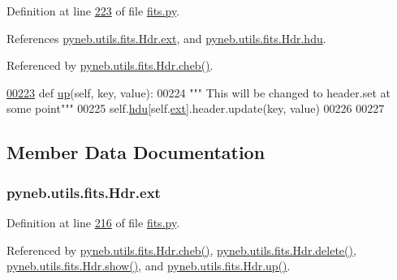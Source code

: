 Definition at line \hyperlink{fits_8py_source_l00223}{223} of file \hyperlink{fits_8py_source}{fits.\+py}.



References \hyperlink{fits_8py_source_l00216}{pyneb.\+utils.\+fits.\+Hdr.\+ext}, and \hyperlink{fits_8py_source_l00215}{pyneb.\+utils.\+fits.\+Hdr.\+hdu}.



Referenced by \hyperlink{fits_8py_source_l00232}{pyneb.\+utils.\+fits.\+Hdr.\+cheb()}.


\begin{DoxyCode}
\hypertarget{classpyneb_1_1utils_1_1fits_1_1_hdr_l00223}{}\hyperlink{classpyneb_1_1utils_1_1fits_1_1_hdr_aae5b01b9bc70e2787f31825ff63152a6}{00223}     \textcolor{keyword}{def }\hyperlink{classpyneb_1_1utils_1_1fits_1_1_hdr_aae5b01b9bc70e2787f31825ff63152a6}{up}(self, key, value):
00224         \textcolor{stringliteral}{""" This will be changed to header.set at some point"""}
00225         self.\hyperlink{classpyneb_1_1utils_1_1fits_1_1_hdr_a23de98701ac30e7c56654f92d9956fca}{hdu}[self.\hyperlink{classpyneb_1_1utils_1_1fits_1_1_hdr_a1c2f102effab05a497e3a21ed3291359}{ext}].header.update(key, value)
00226         
00227 
\end{DoxyCode}


\subsection{Member Data Documentation}
\hypertarget{classpyneb_1_1utils_1_1fits_1_1_hdr_a1c2f102effab05a497e3a21ed3291359}{}
\subsubsection[{ext}]{\setlength{\rightskip}{0pt plus 5cm}pyneb.\+utils.\+fits.\+Hdr.\+ext}\label{classpyneb_1_1utils_1_1fits_1_1_hdr_a1c2f102effab05a497e3a21ed3291359}


Definition at line \hyperlink{fits_8py_source_l00216}{216} of file \hyperlink{fits_8py_source}{fits.\+py}.



Referenced by \hyperlink{fits_8py_source_l00232}{pyneb.\+utils.\+fits.\+Hdr.\+cheb()}, \hyperlink{fits_8py_source_l00228}{pyneb.\+utils.\+fits.\+Hdr.\+delete()}, \hyperlink{fits_8py_source_l00219}{pyneb.\+utils.\+fits.\+Hdr.\+show()}, and \hyperlink{fits_8py_source_l00223}{pyneb.\+utils.\+fits.\+Hdr.\+up()}.

